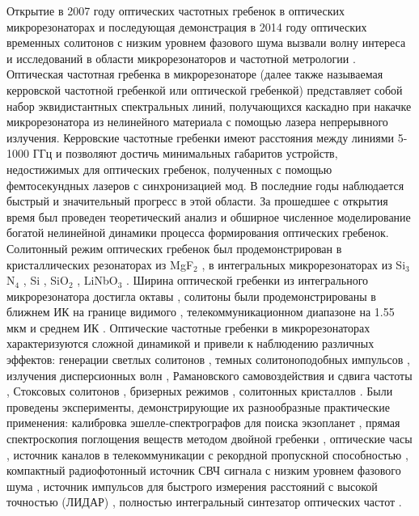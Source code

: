 {\actuality} Открытие в 2007 году оптических частотных гребенок в оптических микрорезонаторах \cite{DelHaye2007} и последующая демонстрация в 2014 году оптических временных солитонов \cite{Herr2014} с низким уровнем фазового шума вызвали волну интереса и исследований в области микрорезонаторов и частотной метрологии \cite{Kippenberg2011,Kippenbergeaan8083}. Оптическая частотная гребенка в микрорезонаторе (далее также называемая керровской частотной гребенкой или оптической гребенкой) представляет собой набор эквидистантных спектральных линий, получающихся каскадно при накачке микрорезонатора из нелинейного материала с помощью лазера непрерывного излучения. Керровские частотные гребенки имеют расстояния между линиями 5-1000 ГГц и позволяют достичь минимальных габаритов устройств, недостижимых для оптических гребенок, полученных с помощью фемтосекундных лазеров с синхронизацией мод. В последние годы наблюдается быстрый и значительный прогресс в этой области. За прошедшее с открытия время был проведен теоретический анализ и обширное численное моделирование богатой нелинейной динамики процесса формирования оптических гребенок. Солитонный режим оптических гребенок был продемонстрирован в кристаллических резонаторах из MgF$_2$ \cite{Herr2014}, в интегральных микрорезонаторах из Si$_3$N$_4$ \cite{Brasch2016}, Si \cite{Yu2016}, SiO$_2$ \cite{Yi2015}, LiNbO$_3$ \cite{2018arXiv181209610H}. Ширина оптической гребенки из интегрального микрорезонатора достигла октавы \cite{Pfeiffer:17}, солитоны были продемонстрированы в ближнем ИК на границе видимого \cite{Karpov2018}, телекоммуникационном диапазоне на 1.55 мкм \cite{Herr2014} и среднем ИК \cite{Griffith2016}. Оптические частотные гребенки в микрорезонаторах характеризуются сложной динамикой и привели к наблюдению различных эффектов: генерации светлых солитонов \cite{Herr2014}, темных солитоноподобных импульсов \cite{Xue2015}, излучения дисперсионных волн \cite{Brasch2016}, Рамановского самовоздействия и сдвига частоты \cite{Karpov2016}, Стоксовых солитонов \cite{Yang2016stokes}, бризерных режимов \cite{Lucas2017breather}, солитонных кристаллов \cite{Cole2017crystals}. Были проведены эксперименты, демонстрирующие их разнообразные практические применения: калибровка эшелле-спектрографов для поиска экзопланет \cite{Obrzud2019}, прямая спектроскопия поглощения веществ методом двойной гребенки \cite{Suh2016}, оптические часы \cite{Papp2014}, источник каналов в телекоммуникации с рекордной пропускной способностью \cite{MarinPalomo2017}, компактный радиофотонный источник СВЧ сигнала с низким уровнем фазового шума \cite{Liang2015}, источник импульсов для быстрого измерения расстояний с высокой точностью (ЛИДАР) \cite{Trocha887}, полностью интегральный синтезатор оптических частот \cite{Spencer2018}.

